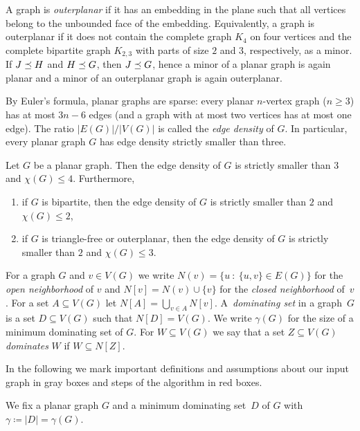 A graph is \emph{outerplanar} if it has an embedding in the plane such
that all vertices belong to the unbounded face of the embedding.
Equivalently, a graph is outerplanar if it does not contain the
complete graph $K_4$ on four vertices and the complete bipartite graph
$K_{2,3}$ with parts of size $2$ and $3$, respectively, as a minor. If
$J\preceq H$ and $H\preceq G$, then $J\preceq G$, hence a minor of a
planar graph is again planar and a minor of an outerplanar graph is
again outerplanar.


By Euler's formula, planar graphs are sparse: every planar $n$-vertex
graph ($n\geq 3$) has at most $3n-6$ edges (and a graph with at most
two vertices has at most one edge). The ratio $|E(G)|/|V(G)|$ is
called the \emph{edge density} of $G$. In particular, every planar
graph $G$ has edge density strictly smaller than three.

\begin{lemma}\label{lem:densities}
  Let $G$ be a planar graph. Then the edge density of $G$ is strictly
  smaller than $3$ and $\chi(G)\leq 4$. Furthermore,

  \vspace{-1mm}
  \begin{enumerate}
  \item if $G$ is bipartite, then the edge density of $G$ is strictly
    smaller than $2$ and $\chi(G)\leq 2$,\smallskip
  \item if $G$ is triangle-free or outerplanar, then the edge density
    of $G$ is strictly smaller than $2$ and $\chi(G)\leq 3$.
  \end{enumerate}
\end{lemma}

For a graph $G$ and $v\in V(G)$ we write
$N(v)=\{u~:~\{u,v\}\in E(G)\}$ for the \emph{open neighborhood} of $v$
and $N[v]=N(v)\cup\{v\}$ for the \emph{closed neighborhood}
of~$v$. For a set $A\subseteq V(G)$ let $N[A]=\bigcup_{v\in A}N[v]$.
A~\emph{dominating set} in a graph~$G$ is a set $D\subseteq V(G)$ such
that $N[D]=V(G)$. We write $\gamma(G)$ for the size of a minimum
dominating set of $G$. For $W\subseteq V(G)$ we say that a set
$Z\subseteq V(G)$ \emph{dominates} $W$ if $W\subseteq N[Z]$.

\smallskip
In the following we mark important definitions and assumptions about
our input graph in gray boxes and steps of the algorithm in red boxes.

\begin{tcolorbox}
  We fix a planar graph $G$ and a minimum dominating set~$D$ of $G$
  with $\gamma \coloneqq |D|=\gamma(G)$.
\end{tcolorbox}
